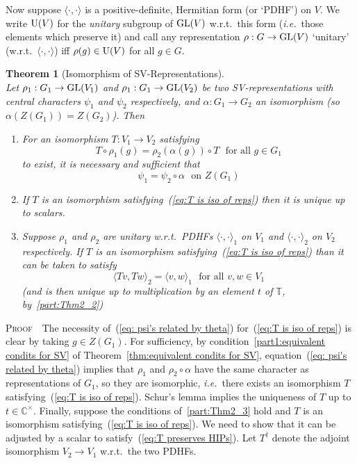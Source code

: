 \documentclass[12pt]{article}
\newtheorem{thm}{Theorem}[section]
\newcommand{\bbC}{\ensuremath{\mathbb{C}}}\newcommand{\bbCp}{\ensuremath{\mathbb{C}_p}}
\newcommand{\bbT}{\ensuremath{\mathbb{T}}}
\newcommand{\bPf}{\noindent \textsc{Proof\ }}
\newcommand{\GL}{{\rm GL}}
\newcommand{\ie}{{\em i.e.}}
\begin{document}
Now suppose $\langle\cdot,\cdot\rangle$ is a  positive-definite, Hermitian form (or `PDHF') on $V$. We write $  {\rm U}(V)$ for the {\em unitary} subgroup of $\GL(V)$ w.r.t.\ this form (\ie\ those elements which preserve it) and call any representation $\rho:G\rightarrow \GL(V)$ `unitary' (w.r.t.\  $\langle\cdot,\cdot\rangle$) iff $\rho(g)\in   {\rm U}(V)$ for all $g\in G$. 
\begin{thm}[Isomorphism of SV-Representations]\label{thm:iso of gps gives iso of SV-R's}\ \\
Let $\rho_1:G_1\rightarrow \GL(V_1)$ and $\rho_1:G_1\rightarrow \GL(V_2)$ be two SV-representations 
with central characters $\psi_1$ and $\psi_2$ respectively, and $\alpha: G_1 \rightarrow G_2$ an isomorphism (so $\alpha(Z(G_1))=Z(G_2)$). Then 
\begin{enumerate}
	\item\label{part:Thm2_1} For an isomorphism $ T:V_1\rightarrow V_2$ satisfying 
	\begin{equation}\label{eq:T is iso of reps}
		T\circ\rho_1(g)=\rho_2(\alpha(g))\circ T
		\ \ \ \mbox{for all $g\in G_1$}
	\end{equation}
	to exist, it is necessary and sufficient that  
	\begin{equation}\label{eq: psi's related by theta}
		\psi_1=\psi_2\circ\alpha\ \ \ \mbox{on $Z(G_1)$}
	\end{equation} 
	\item\label{part:Thm2_2} If $T$ is an isomorphism satisfying~(\ref{eq:T is iso of reps}) then it is unique up to scalars.
	\item\label{part:Thm2_3} Suppose $\rho_1$ and $\rho_2$ are unitary
	w.r.t.\ PDHFs $\langle\cdot,\cdot\rangle_1$ on $V_1$ and $\langle\cdot,\cdot\rangle_2$ on $V_2$ respectively. If $T$ is an isomorphism satisfying~(\ref{eq:T is iso of reps}) than it can be taken to satisfy 
	\begin{equation}\label{eq:T preserves HIPs}
		\langle Tv, Tw\rangle_2=\langle v, w\rangle_1\ \ \ \mbox{for all $v,w\in V_1$}
	\end{equation}
	 (and is then unique up to multiplication by an element $t$ of $\bbT$, by~\ref{part:Thm2_2})
\end{enumerate}
\end{thm}   
\bPf\ The necessity of~(\ref{eq: psi's related by theta}) for~(\ref{eq:T is iso of reps}) is clear by taking $g\in Z(G_1)$. For sufficiency,  by condition~\ref{part1:equivalent condits for SV} of Theorem~\ref{thm:equivalent condits for SV}, equation~(\ref{eq: psi's related by theta})  implies that $\rho_1$ and $\rho_2\circ\alpha$ have the same character as representations of $G_1$, so they are isomorphic, \ie\ there exists an isomorphism $T$ satisfying~(\ref{eq:T is iso of reps}). Schur's lemma implies the uniqueness of $T$ up to $t\in\bbC^\times$. Finally, suppose the conditions of~\ref{part:Thm2_3} hold and $T$ is an isomorphism  satisfying~(\ref{eq:T is iso of reps}). We need to show that it can be adjusted by a scalar to satisfy~(\ref{eq:T preserves HIPs}). Let $T^\dagger$ denote the adjoint isomorphism $V_2\rightarrow V_1$ w.r.t.\ the two PDHFs. 
\end{document}
